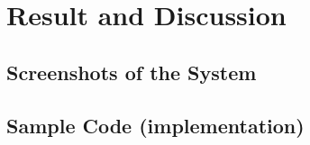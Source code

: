 

\chapter{Result and Discussion} \label{chap5}
\newpage

\section{Screenshots of the System}

\section{Sample Code (implementation)}

